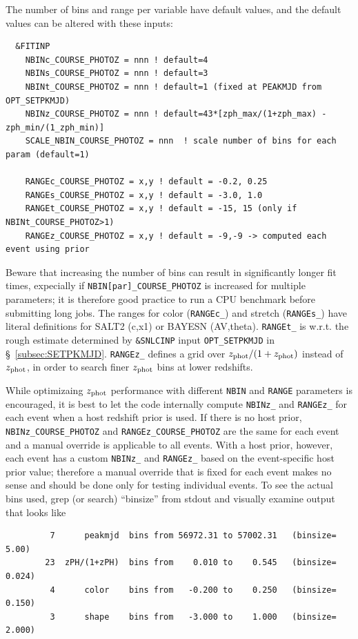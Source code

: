 \documentclass[12pt]{article}
\newcommand{\Zphot}{z_{\rm phot}}
\begin{document}
The number of bins and range per variable have default values,
and the default values can be altered with these inputs:
\begin{verbatim}
  &FITINP
    NBINc_COURSE_PHOTOZ = nnn ! default=4  
    NBINs_COURSE_PHOTOZ = nnn ! default=3  
    NBINt_COURSE_PHOTOZ = nnn ! default=1 (fixed at PEAKMJD from OPT_SETPKMJD)
    NBINz_COURSE_PHOTOZ = nnn ! default=43*[zph_max/(1+zph_max) - zph_min/(1_zph_min)]
    SCALE_NBIN_COURSE_PHOTOZ = nnn  ! scale number of bins for each param (default=1)

    RANGEc_COURSE_PHOTOZ = x,y ! default = -0.2, 0.25
    RANGEs_COURSE_PHOTOZ = x,y ! default = -3.0, 1.0
    RANGEt_COURSE_PHOTOZ = x,y ! default = -15, 15 (only if NBINt_COURSE_PHOTOZ>1)
    RANGEz_COURSE_PHOTOZ = x,y ! default = -9,-9 -> computed each event using prior
\end{verbatim}
Beware that increasing the number of bins can result in significantly longer fit times, 
expecially if {\tt NBIN[par]\_COURSE\_PHOTOZ}
is increased for multiple parameters;
it is therefore good practice to run a CPU benchmark before submitting long jobs.
The ranges for color ({\tt RANGEc\_}) and stretch ({\tt RANGEs\_}) have literal definitions
for SALT2 (c,x1) or BAYESN (AV,theta). 
{\tt RANGEt\_} is w.r.t. the rough estimate determined by {\tt \&SNLCINP} input 
{\tt OPT\_SETPKMJD} in \S~\ref{subsec:SETPKMJD}.
{\tt RANGEz\_} defines a grid over $\Zphot/(1+\Zphot)$ instead of $\Zphot$, in order to 
search finer $\Zphot$ bins at lower redshifts.

While optimizaing $\Zphot$ performance with different {\tt NBIN} and {\tt RANGE} parameters 
is encouraged,
it is best to let the code internally compute {\tt NBINz\_} and {\tt RANGEz\_} for each event
when a host redshift prior is used.
If there is no host prior, {\tt NBINz\_COURSE\_PHOTOZ} and {\tt RANGEz\_COURSE\_PHOTOZ}
are the same for each event and a manual override is applicable to all events.
With a host prior, however, each event has a custom {\tt NBINz\_} and {\tt RANGEz\_}
based on the event-specific host prior value;
therefore a manual override that is fixed for each event makes no sense and
should be done only for testing individual events.
To see the actual bins used, grep (or search) ``binsize'' from stdout and 
visually examine output that looks like
%
\begin{verbatim}
         7      peakmjd  bins from 56972.31 to 57002.31   (binsize=   5.00)
        23  zPH/(1+zPH)  bins from    0.010 to    0.545   (binsize=  0.024)
         4      color    bins from   -0.200 to    0.250   (binsize=  0.150)
         3      shape    bins from   -3.000 to    1.000   (binsize=  2.000) 
\end{verbatim}
\end{document}
